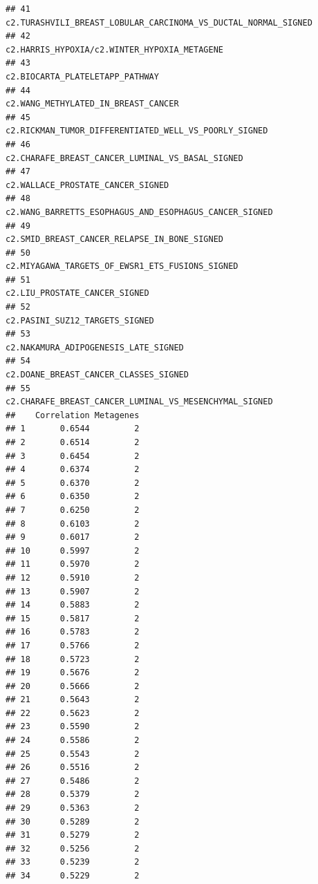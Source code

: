 \documentclass{article}\usepackage[]{graphicx}\usepackage[]{color}
\makeatletter
\newenvironment{kframe}{%
 \def\at@end@of@kframe{}%
 \ifinner\ifhmode%
  \def\at@end@of@kframe{\end{minipage}}%
  \begin{minipage}{\columnwidth}%
 \fi\fi%
 \def\FrameCommand##1{\hskip\@totalleftmargin \hskip-\fboxsep
 \colorbox{shadecolor}{##1}\hskip-\fboxsep
     \hskip-\linewidth \hskip-\@totalleftmargin \hskip\columnwidth}%
 \MakeFramed {\advance\hsize-\width
   \@totalleftmargin\z@ \linewidth\hsize
   \@setminipage}}%
 {\par\unskip\endMakeFramed%
 \at@end@of@kframe}
\newenvironment{knitrout}{}{} %
\makeatother
\begin{document}
\begin{knitrout}
\begin{kframe}
\begin{verbatim}
## 41                                         c2.TURASHVILI_BREAST_LOBULAR_CARCINOMA_VS_DUCTAL_NORMAL_SIGNED
## 42                                                           c2.HARRIS_HYPOXIA/c2.WINTER_HYPOXIA_METAGENE
## 43                                                                        c2.BIOCARTA_PLATELETAPP_PATHWAY
## 44                                                                    c2.WANG_METHYLATED_IN_BREAST_CANCER
## 45                                                  c2.RICKMAN_TUMOR_DIFFERENTIATED_WELL_VS_POORLY_SIGNED
## 46                                                       c2.CHARAFE_BREAST_CANCER_LUMINAL_VS_BASAL_SIGNED
## 47                                                                      c2.WALLACE_PROSTATE_CANCER_SIGNED
## 48                                                 c2.WANG_BARRETTS_ESOPHAGUS_AND_ESOPHAGUS_CANCER_SIGNED
## 49                                                           c2.SMID_BREAST_CANCER_RELAPSE_IN_BONE_SIGNED
## 50                                                        c2.MIYAGAWA_TARGETS_OF_EWSR1_ETS_FUSIONS_SIGNED
## 51                                                                          c2.LIU_PROSTATE_CANCER_SIGNED
## 52                                                                         c2.PASINI_SUZ12_TARGETS_SIGNED
## 53                                                                   c2.NAKAMURA_ADIPOGENESIS_LATE_SIGNED
## 54                                                                  c2.DOANE_BREAST_CANCER_CLASSES_SIGNED
## 55                                                 c2.CHARAFE_BREAST_CANCER_LUMINAL_VS_MESENCHYMAL_SIGNED
##    Correlation Metagenes
## 1       0.6544         2
## 2       0.6514         2
## 3       0.6454         2
## 4       0.6374         2
## 5       0.6370         2
## 6       0.6350         2
## 7       0.6250         2
## 8       0.6103         2
## 9       0.6017         2
## 10      0.5997         2
## 11      0.5970         2
## 12      0.5910         2
## 13      0.5907         2
## 14      0.5883         2
## 15      0.5817         2
## 16      0.5783         2
## 17      0.5766         2
## 18      0.5723         2
## 19      0.5676         2
## 20      0.5666         2
## 21      0.5643         2
## 22      0.5623         2
## 23      0.5590         2
## 24      0.5586         2
## 25      0.5543         2
## 26      0.5516         2
## 27      0.5486         2
## 28      0.5379         2
## 29      0.5363         2
## 30      0.5289         2
## 31      0.5279         2
## 32      0.5256         2
## 33      0.5239         2
## 34      0.5229         2

\end{verbatim}
\end{kframe}
\end{knitrout}
\end{document}
